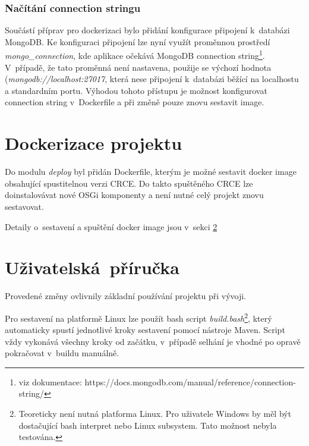 \documentclass[12pt, a4paper]{article}
\begin{document}
\subsubsection{Načítání connection stringu}

Součástí příprav pro dockerizaci bylo přidání konfigurace připojení k~databázi MongoDB. Ke konfiguraci připojení lze nyní využít proměnnou prostředí \textit{mongo\_connection}, kde aplikace očekává MongoDB connection string\footnote{viz dokumentace: https://docs.mongodb.com/manual/reference/connection-string/}. V~případě, že tato proměnná není nastavena, použije se výchozí hodnota (\textit{mongodb://localhost:27017}, která nese připojení k~databázi běžící na localhostu a standardním portu. Výhodou tohoto přístupu je možnost konfigurovat connection string v~Dockerfile a při změně pouze znovu sestavit image.


\section{Dockerizace projektu}
Do modulu \textit{deploy} byl přidán Dockerfile, kterým je možné sestavit docker image obsahující spustitelnou verzi CRCE. Do takto spuštěného CRCE lze doinstalovávat nové OSGi komponenty a není nutné celý projekt znovu sestavovat. 

Detaily o~sestavení a spuštění docker image jsou v~sekci \ref{sec:manual}

\section{Uživatelská~příručka}
\label{sec:manual} %

Provedené změny ovlivnily základní používání projektu při vývoji. 

Pro sestavení na platformě Linux lze použít bash script \textit{build.bash}\footnote{Teoreticky není nutná platforma Linux. Pro uživatele Windows by měl být dostačující bash interpret nebo Linux subsystem. Tato možnost nebyla testována.}, který automaticky spustí jednotlivé kroky sestavení pomocí nástroje Maven. Script vždy vykonává všechny kroky od začátku, v~případě selhání je vhodné po opravě pokračovat v~buildu manuálně.
\end{document}
